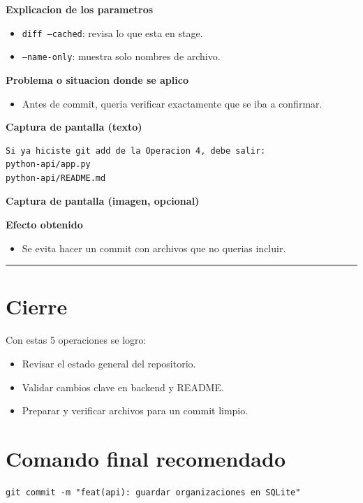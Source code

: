 \documentclass[12pt,a4paper]{article}
\begin{document}
\textbf{Explicacion de los parametros}
\begin{itemize}[leftmargin=*]
\item \texttt{diff --cached}: revisa lo que esta en stage.
\item \texttt{--name-only}: muestra solo nombres de archivo.
\end{itemize}

\textbf{Problema o situacion donde se aplico}
\begin{itemize}[leftmargin=*]
\item Antes de commit, queria verificar exactamente que se iba a confirmar.
\end{itemize}

\textbf{Captura de pantalla (texto)}
\begin{Verbatim}[fontsize=\small,frame=single]
Si ya hiciste git add de la Operacion 4, debe salir:
python-api/app.py
python-api/README.md
\end{Verbatim}

\textbf{Captura de pantalla (imagen, opcional)}

\textbf{Efecto obtenido}
\begin{itemize}[leftmargin=*]
\item Se evita hacer un commit con archivos que no querias incluir.
\end{itemize}

\hrule
\vspace{0.4cm}

\section*{Cierre}
Con estas 5 operaciones se logro:
\begin{itemize}[leftmargin=*]
\item Revisar el estado general del repositorio.
\item Validar cambios clave en backend y README.
\item Preparar y verificar archivos para un commit limpio.
\end{itemize}

\section*{Comando final recomendado}
\begin{Verbatim}[fontsize=\small,frame=single]
git commit -m "feat(api): guardar organizaciones en SQLite"
\end{Verbatim}
\end{document}
